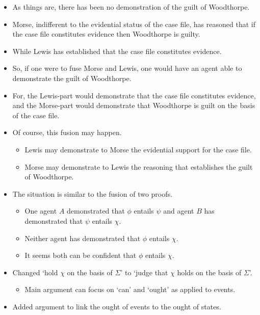 \documentclass[10pt]{article}
\begin{document}
\newpage

\begin{itemize}
\item As things are, there has been no demonstration of the guilt of Woodthorpe.
\item Morse, indifferent to the evidential status of the case file, has reasoned that if the case file constitutes evidence then Woodthorpe is guilty.
\item While Lewis has established that the case file constitutes evidence.
\item So, if one were to fuse Morse and Lewis, one would have an agent able to demonstrate the guilt of Woodthorpe.
\item For, the Lewis-part would demonstrate that the case file constitutes evidence, and the Morse-part would demonstrate that Woodthorpe is guilt on the basis of the case file.
\item Of course, this fusion may happen.
  \begin{itemize}
  \item Lewis may demonstrate to Morse the evidential support for the case file.
  \item Morse may demonstrate to Lewis the reasoning that establishes the guilt of Woodthorpe.
  \end{itemize}
\item The situation is similar to the fusion of two proofs.
  \begin{itemize}
  \item One agent \(A\) demonstrated that \(\phi\) entails \(\psi\) and agent \(B\) has demonstrated that \(\psi\) entails \(\chi\).
  \item Neither agent has demonstrated that \(\phi\) entails \(\chi\).
  \item It seems both can be confident that \(\phi\) entails \(\chi\).
  \end{itemize}
\end{itemize}

\newpage

\begin{note}
  \begin{itemize}
  \item Changed `hold \(\chi\) on the basis of \(\Sigma\)' to `judge that \(\chi\) holds on the basis of \(\Sigma\)'.
    \begin{itemize}
    \item Main argument can focus on `can' and `ought' as applied to events.
    \end{itemize}
  \item Added argument to link the ought of events to the ought of states.
  \end{itemize}
\end{note}
\end{document}
